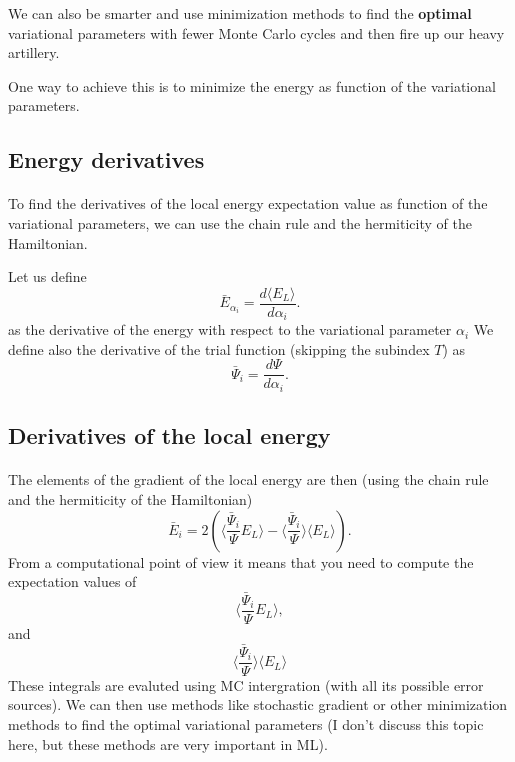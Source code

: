 \documentclass[%
oneside,                 %
final,                   %
10pt]{article}
\begin{document}
We can also be smarter and use minimization methods to find the \textbf{optimal} variational parameters with fewer Monte Carlo cycles and then 
fire up our heavy artillery. 

One way to achieve this is to minimize the energy as function of the variational parameters.



\subsection{Energy derivatives}

\paragraph{}
To find the derivatives of the local energy expectation value as function of the variational parameters, we can use the chain rule and the hermiticity of the Hamiltonian.  

Let us define 
\[
\bar{E}_{\alpha_i}=\frac{d\langle  E_L\rangle}{d\alpha_i}.
\]
as the derivative of the energy with respect to the variational parameter $\alpha_i$
We define also the derivative of the trial function (skipping the subindex $T$) as 
\[
\bar{\Psi}_{i}=\frac{d\Psi}{d\alpha_i}.
\]




\subsection{Derivatives of the local energy}

\paragraph{}
The elements of the gradient of the local energy are then (using the chain rule and the hermiticity of the Hamiltonian)
\[
\bar{E}_{i}= 2\left( \langle \frac{\bar{\Psi}_{i}}{\Psi}E_L\rangle -\langle \frac{\bar{\Psi}_{i}}{\Psi}\rangle\langle E_L \rangle\right).
\]
From a computational point of view it means that you need to compute the expectation values of 
\[
\langle \frac{\bar{\Psi}_{i}}{\Psi}E_L\rangle,
\]
and
\[
\langle \frac{\bar{\Psi}_{i}}{\Psi}\rangle\langle E_L\rangle
\]
These integrals are evaluted using MC intergration (with all its possible error sources). 
We can then use methods like stochastic gradient or other minimization methods to find the optimal variational parameters (I don't discuss this topic here, but these methods are very important in ML).
\end{document}
